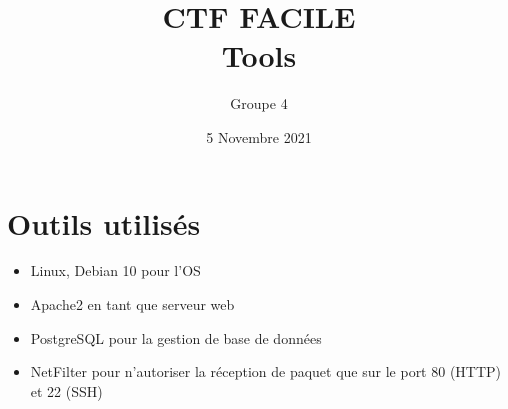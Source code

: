 \documentclass{article}
\title{\textbf{CTF FACILE}\\ \textbf{Tools}}
\author{Groupe 4}
\date{5 Novembre 2021}
\begin{document}
\maketitle

\section*{Outils utilisés}
\setlength{\parindent}{1cm}
\begin{itemize}

\item Linux, Debian 10 pour l'OS
\item Apache2 en tant que serveur web
\item PostgreSQL pour la gestion de base de données
\item NetFilter pour n'autoriser la réception de paquet que sur le port 80 (HTTP) et 22 (SSH)
\end{itemize}
\end{document}
